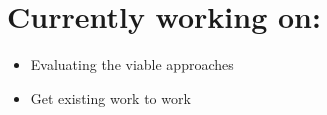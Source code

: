 \documentclass{beamer}
\begin{document}
\section{Currently working on:}
\begin{frame}{}
    \begin{itemize}
        \item<1-> Evaluating the viable approaches
        \item<2-> Get existing work to work
    \end{itemize}
\end{frame}


\printbibliography














\end{document}
